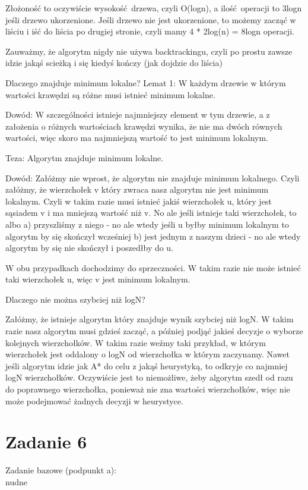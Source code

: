 \documentclass[12pt]{article}
\begin{document}
Złożoność to oczywiście wysokość drzewa, czyli O(logn), a ilość operacji to 3logn jeśli drzewo ukorzenione. Jeśli drzewo nie jest ukorzenione, to możemy zacząć w liściu i iść do liścia po drugiej stronie, czyli mamy 4 * 2log(n) = 8logn operacji.

Zauważmy, że algorytm nigdy nie używa backtrackingu, czyli po prostu zawsze idzie jakąś scieżką i się kiedyś kończy (jak dojdzie do liścia)


Dlaczego znajduje minimum lokalne?
Lemat 1:
W każdym drzewie w którym wartości krawędzi są różne musi istnieć minimum lokalne. 

Dowód:
W szczególności istnieje najmniejszy element w tym drzewie, a z założenia o różnych wartościach krawędzi wynika, że nie ma dwóch równych wartości, więc skoro ma najmniejszą wartość to jest minimum lokalnym.


Teza: Algorytm znajduje minimum lokalne.

Dowód:
Załóżmy nie wprost, że algorytm nie znajduje minimum lokalnego. Czyli załóżmy, że wierzchołek v który zwraca nasz algorytm nie jest minimum lokalnym. Czyli w takim razie musi istnieć jakiś wierzchołek u, który jest sąsiadem v i ma mniejszą wartość niż v. No ale jeśli istnieje taki wierzchołek, to albo 
a) przyszliśmy z niego - no ale wtedy jeśli u byłby minimum lokalnym to algorytm by się skończył wcześniej 
b) jest jednym z naszym dzieci - no ale wtedy algorytm by się nie skończył i poszedłby do u.

W obu przypadkach dochodzimy do sprzeczności.
W takim razie nie może istnieć taki wierzchołek u, więc v jest minimum lokalnym.




Dlaczego nie można szybciej niż logN? 

Załóżmy, że istnieje algorytm który znajduje wynik szybciej niż logN. W takim razie nasz algorytm musi gdzieś zacząć, a później podjąć jakieś decyzje o wyborze kolejnych wierzchołków. W takim razie weźmy taki przykład, w którym wierzchołek jest oddalony o logN od wierzchołka w którym zaczynamy. Nawet jeśli algorytm idzie jak A* do celu z jakąś heurystyką, to odkryje co najmniej logN wierzchołków. Oczywiście jest to niemożliwe, żeby algorytm szedł od razu do poprawnego wierzchołka, ponieważ nie zna wartości wierzchołków, więc nie może podejmować żadnych decyzji w heurystyce.


\section{Zadanie 6}
Zadanie bazowe (podpunkt a):\\
nudne\\
\end{document}
